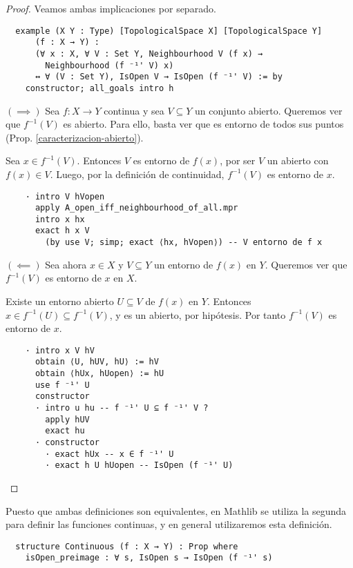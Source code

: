 \begin{proof} Veamos ambas implicaciones por separado.

  \begin{lstlisting}
  example (X Y : Type) [TopologicalSpace X] [TopologicalSpace Y]
      (f : X → Y) :
      (∀ x : X, ∀ V : Set Y, Neighbourhood V (f x) →
        Neighbourhood (f ⁻¹' V) x)
      ↔ ∀ (V : Set Y), IsOpen V → IsOpen (f ⁻¹' V) := by
    constructor; all_goals intro h \end{lstlisting}

  $(\implies)$ Sea $f : X \to Y$ continua y sea $V \subseteq Y$ un conjunto abierto. Queremos ver que $f^{-1}(V)$ es abierto. Para ello, basta ver que es entorno de todos sus puntos (Prop. \ref{caracterizacion-abierto}).
  
  Sea $x \in f^{-1}(V)$. Entonces $V$ es entorno de $f(x)$, por ser $V$ un abierto con $f(x) \in V$. Luego, por la definición de continuidad, $f^{-1}(V)$ es entorno de $x$.

  \begin{lstlisting}
    · intro V hVopen
      apply A_open_iff_neighbourhood_of_all.mpr
      intro x hx
      exact h x V
        (by use V; simp; exact ⟨hx, hVopen⟩) -- V entorno de f x \end{lstlisting}

  $(\impliedby)$ Sea ahora $x \in X$ y $V \subseteq Y$ un entorno de $f(x)$ en $Y$. Queremos ver que $f^{-1}(V)$ es entorno de $x$ en $X$.
  
  Existe un entorno abierto $U\subseteq V$ de $f(x)$ en $Y$. Entonces $x \in f^{-1}(U)\subseteq f^{-1}(V)$, y es un abierto, por hipótesis. Por tanto $f^{-1}(V)$ es entorno de $x$.

  \begin{lstlisting}
    · intro x V hV
      obtain ⟨U, hUV, hU⟩ := hV
      obtain ⟨hUx, hUopen⟩ := hU
      use f ⁻¹' U
      constructor
      · intro u hu -- f ⁻¹' U ⊆ f ⁻¹' V ?
        apply hUV
        exact hu
      · constructor
        · exact hUx -- x ∈ f ⁻¹' U
        · exact h U hUopen -- IsOpen (f ⁻¹' U) \end{lstlisting}
  
\end{proof}

Puesto que ambas definiciones son equivalentes, en Mathlib se utiliza la segunda para definir las funciones continuas, y en general utilizaremos esta definición.

\begin{lstlisting}
  structure Continuous (f : X → Y) : Prop where
    isOpen_preimage : ∀ s, IsOpen s → IsOpen (f ⁻¹' s)
\end{lstlisting}

